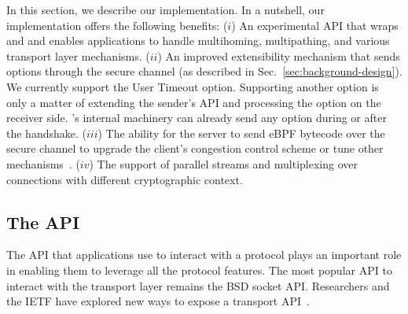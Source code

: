 \label{sec:content}


In this section, we describe our \tcpls implementation.  In a nutshell, our implementation offers the following benefits:
($i$) An experimental API that wraps \tls and \tcp and enables applications to
    handle multihoming, multipathing, and various transport layer mechanisms.
($ii$) An improved \tcp extensibility mechanism that sends \tcp options
   through the secure \tcpls channel (as described in Sec.~\ref{sec:background-design}). We currently support the \tcp User Timeout option. Supporting another \tcp option is only a matter of extending the sender's API and processing the option on the receiver side. \tcpls's internal machinery can already send any \tcp option during or after the handshake.
($iii$) The ability for the server to send eBPF bytecode over the secure
  channel to upgrade the client's \tcp congestion control scheme or
  tune other \tcp mechanisms~\cite{brakmo2017tcp, tran2019beyond}.
($iv$) The support of parallel streams and multiplexing over \tcp connections
  with different cryptographic context.


\subsection{The \tcpls API}

The API that applications use to interact with a protocol plays an important
role in enabling them to leverage all the protocol features. The most
popular API to interact with the transport layer remains the BSD socket
API. Researchers and the IETF have explored new ways to expose a transport API~\cite{draft-ietf-taps-arch,hruby2014sockets,rfc6458,hesmans2016enhanced,schmidt2013socket}.

